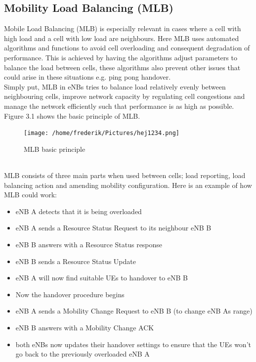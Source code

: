 \documentclass{report}
\begin{document}
\subsection{Mobility Load Balancing (MLB)}
Mobile Load Balancing (MLB) is especially relevant in cases where a cell with high load and a cell with low load are neighbours. Here MLB uses automated algorithms and functions to avoid cell overloading and consequent degradation of performance. This is achieved by having the algorithms adjust parameters to balance the load between cells, these algorithms also prevent other issues that could arise in these situations e.g. ping pong handover. \\
Simply put, MLB in eNBs tries to balance load relatively evenly between neighbouring cells, improve network capacity by regulating cell congestions and manage the network efficiently such that performance is as high as possible. Figure 3.1 shows the basic principle of MLB. 
\begin{figure}[!ht]
	\centering
	\texttt{[image: /home/frederik/Pictures/hej1234.png]}
	\caption{MLB basic principle \cite{Hahn2014}}
\end{figure}
\\
MLB consists of three main parts when used between cells; load reporting, load balancing action and amending mobility configuration.
Here is an example of how MLB could work:
\begin{itemize}
	\item eNB A detects that it is being overloaded
	\item eNB A sends a Resource Status Request to its neighbour eNB B
	\item eNB B answers with a Resource Status response
	\item eNB B sends a Resource Status Update
	\item eNB A will now find suitable UEs to handover to eNB B
	\item Now the handover procedure begins
	\item eNB A sends a Mobility Change Request to eNB B (to change eNB As range)
	\item eNB B answers with a Mobility Change ACK
	\item both eNBs now updates their handover settings to ensure that the UEs won't go back to the previously overloaded eNB A \cite{Sartori2012}
\end{itemize}
\end{document}
